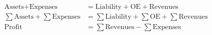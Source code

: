 \begin{align}
    \text{Assets} + \text{Expenses} &= \text{Liability} + \text{OE} + \text{Revenues} \\
    \sum \text{Assets} + \sum \text{Expenses} &= \sum \text{Liability} + \sum \text{OE} + \sum \text{Revenues} \\
    \text{Profit} &= \sum \text{Revenues} - \sum \text{Expenses}
\end{align}

